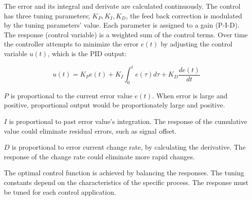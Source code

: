 \documentclass[\main/master.tex]{subfiles}
\begin{document}
\par\noindent
The error and its integral and derivate are calculated continuously. The control has three tuning parameters; $K_P, K_I, K_D$, the feed back correction is modulated by the tuning parameters' value. Each parameter is assigned to a gain (P-I-D). The response (control variable) is a weighted sum of the control terms. Over time the controller attempts to minimize the error $e(t)$ by adjusting the control variable $u(t)$, which is the PID output:
\par\noindent

\begin{equation}
u(t) = K_P e(t)+K_I\int_{0}^{t}e(\tau)d\tau+K_D\frac{de(t)}{dt}   \label{eqn:PID response}
\end{equation}

\noindent
$P$ is proportional to the current error value $e(t)$. When error is large and positive, proportional output would be proportionately large and positive.
\par\noindent
$I$ is proportional to past error value's integration. The response of the cumulative value could eliminate residual errors, such as signal offset.
\par\noindent
$D$ is proportional to error current change rate, by calculating the derivative. The response of the change rate could eliminate more rapid changes.
\par\noindent
The optimal control function is achieved by balancing the responses. The tuning constants depend on the characteristics of the specific process. The response must be tuned for each control application.  
\end{document}
